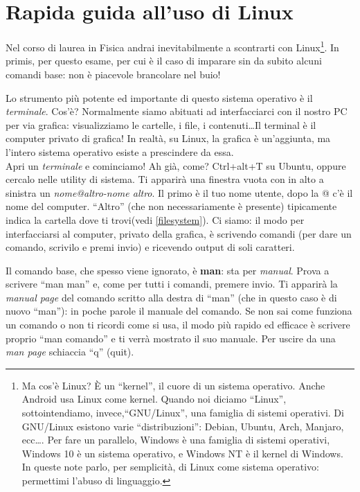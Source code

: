 \chapter{Rapida guida all'uso di Linux}\label{linux}
Nel corso di laurea in Fisica andrai inevitabilmente a scontrarti con Linux\footnote{Ma cos'è Linux? È un ``kernel'', il cuore di un sistema operativo. Anche Android usa Linux come kernel. Quando noi diciamo ``Linux'', sottointendiamo, invece,``GNU/Linux'', una famiglia di sistemi operativi. Di GNU/Linux esistono varie ``distribuzioni'': Debian, Ubuntu, Arch, Manjaro, ecc\ldots. Per fare un parallelo, Windows è una famiglia di sistemi operativi, Windows 10 è un sistema operativo, e Windows NT è il kernel di Windows. In queste note parlo, per semplicità, di Linux come sistema operativo: permettimi l'abuso di linguaggio. }. In primis, per questo esame, per cui è il caso di imparare sin da subito alcuni comandi base: non è piacevole brancolare nel buio!

Lo strumento più potente ed importante di questo sistema operativo è il \emph{terminale}. Cos'è? Normalmente siamo abituati ad interfacciarci con il nostro PC per via grafica: visualizziamo le cartelle, i file, i contenuti\ldots Il terminal è il computer privato di grafica! In realtà, su Linux, la grafica è un'aggiunta, ma l'intero sistema operativo esiste a prescindere da essa. \\

Apri un \emph{terminale} e cominciamo! Ah già, come? Ctrl+alt+T su Ubuntu, oppure cercalo nelle utility di sistema.
Ti apparirà una finestra vuota con in alto a sinistra un \emph{nome@altro-nome altro}. Il primo è il tuo nome utente, dopo la @ c'è il nome del computer. ``Altro'' (che non necessariamente è presente) tipicamente indica la cartella dove ti trovi(vedi \ref{filesystem}). Ci siamo: il modo per interfacciarsi al computer, privato della grafica, è scrivendo comandi (per dare un comando, scrivilo e premi invio) e ricevendo output di soli caratteri. 

Il comando base, che spesso viene ignorato, è \textbf{man}: sta per \emph{manual}. Prova a scrivere ``man man'' e, come per tutti i comandi, premere invio.  Ti apparirà la \emph{manual page} del comando scritto alla destra di ``man'' (che in questo caso è di nuovo ``man''): in poche parole il manuale del comando. Se non sai come funziona un comando o non ti ricordi come si usa, il modo più rapido ed efficace è scrivere proprio ``man comando'' e ti verrà mostrato il suo manuale. Per uscire da una \emph{man page} schiaccia ``q'' (quit). 

